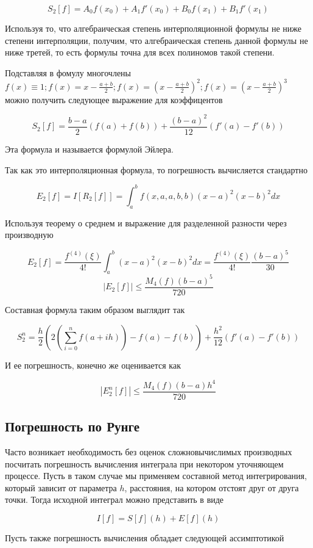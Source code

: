 \documentclass[11pt,a4paper,oneside]{article}
\begin{document}
$$ S_2[f] = A_0 f(x_0) + A_1 f'(x_0) + B_0 f(x_1) + B_1 f'(x_1) $$

Используя то, что алгебраическая степень интерполяционной формулы не ниже степени интерполяции, получим, что алгебраическая степень данной формулы не ниже третей, то есть формулы точна для всех полиномов такой степени.

Подставляя в фомулу многочлены $f(x) \equiv 1; f(x) = x - \frac{a + b}{2}; f(x) = \left( x - \frac{a + b}{2} \right)^2; f(x) = \left( x - \frac{a + b}{2} \right)^3$ можно получить следующее выражение для коэффицентов

$$ S_2[f] = \frac{b - a}{2} \left( f(a) + f(b) \right) + \frac{(b - a)^2}{12} \left( f'(a) - f'(b) \right) $$

Эта формула и называется формулой Эйлера.

Так как это интерполяционная формула, то погрешность вычисляется стандартно

$$ E_2[f] = I[R_2[f]] = \int_{a}^{b} f (x, a, a, b, b) (x - a)^2 (x - b)^2 dx $$

Используя теорему о среднем и выражение для разделенной разности через производную

$$ E_2[f] = \frac{f^{(4)}(\xi)}{4!} \int_{a}^{b} (x - a)^2 (x - b)^2 dx
	= \frac{f^{(4)}(\xi)}{4!} \frac{(b - a)^5}{30} $$
$$ \left| E_2[f] \right| \le \frac{M_4(f) (b - a)^5}{720} $$

Составная формула таким образом выглядит так

$$ S_2^n = \frac{h}{2} \left( 2 \left( \sum_{i = 0}^{n} f(a + ih) \right) - f(a) - f(b) \right) + \frac{h^2}{12} (f'(a) - f'(b)) $$

И ее погрешность, конечно же оценивается как

$$ \left| E_2^n[f] \right| \le \frac{M_4(f) (b - a) h^4}{720} $$


\subsection{Погрешность по Рунге}

Часто возникает необходимость без оценок сложновычислимых производных посчитать погрешность вычисления интеграла при некотором уточняющем процессе. Пусть в таком случае мы применяем составной метод интегрирования, который зависит от параметра $h$, расстояния, на котором отстоят друг от друга точки. Тогда исходной интеграл можно представить в виде

$$ I[f] = S[f](h) + E[f](h) $$

Пусть также погрешность вычисления обладает следующей ассимптотикой
\end{document}
